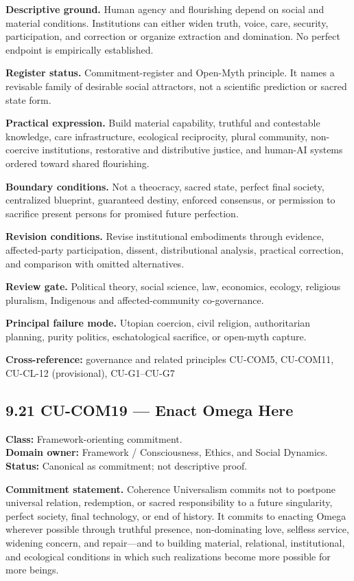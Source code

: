 \documentclass[
  11pt,
]{article}
\begin{document}
\textbf{Descriptive ground.} Human agency and flourishing depend on
social and material conditions. Institutions can either widen truth,
voice, care, security, participation, and correction or organize
extraction and domination. No perfect endpoint is empirically
established.

\textbf{Register status.} Commitment-register and Open-Myth principle.
It names a revisable family of desirable social attractors, not a
scientific prediction or sacred state form.

\textbf{Practical expression.} Build material capability, truthful and
contestable knowledge, care infrastructure, ecological reciprocity,
plural community, non-coercive institutions, restorative and
distributive justice, and human-AI systems ordered toward shared
flourishing.

\textbf{Boundary conditions.} Not a theocracy, sacred state, perfect
final society, centralized blueprint, guaranteed destiny, enforced
consensus, or permission to sacrifice present persons for promised
future perfection.

\textbf{Revision conditions.} Revise institutional embodiments through
evidence, affected-party participation, dissent, distributional
analysis, practical correction, and comparison with omitted
alternatives.

\textbf{Review gate.} Political theory, social science, law, economics,
ecology, religious pluralism, Indigenous and affected-community
co-governance.

\textbf{Principal failure mode.} Utopian coercion, civil religion,
authoritarian planning, purity politics, eschatological sacrifice, or
open-myth capture.

\textbf{Cross-reference:} governance and related principles CU-COM5,
CU-COM11, CU-CL-12 (provisional), CU-G1--CU-G7

\subsection{9.21 CU-COM19 --- Enact Omega
Here}\label{cu-com19-enact-omega-here}

\textbf{Class:} Framework-orienting commitment.\\
\textbf{Domain owner:} Framework / Consciousness, Ethics, and Social
Dynamics.\\
\textbf{Status:} Canonical as commitment; not descriptive proof.

\textbf{Commitment statement.} Coherence Universalism commits not to
postpone universal relation, redemption, or sacred responsibility to a
future singularity, perfect society, final technology, or end of
history. It commits to enacting Omega wherever possible through truthful
presence, non-dominating love, selfless service, widening concern, and
repair---and to building material, relational, institutional, and
ecological conditions in which such realizations become more possible
for more beings.
\end{document}
